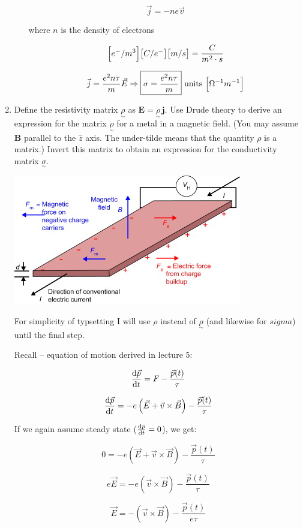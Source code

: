 \begin{enumerate}[label=(\alph*)]
\begin{itemize}
    \[ \vec{j} = - n e \vec{v} \]

    where $n$ is the density of electrons   

    \[ \brackets*{e^-/m^3}\brackets*{C/e^-} \brackets*{m/s} = \frac{C}{m^2 \cdot s} \]

    \[ \vec{j} = \frac{e^2 n \tau}{m} \vec{E} \Rightarrow \boxed{\sigma = \frac{e^2 n \tau}{m}} \text{ units } \brackets*{\Omega^{-1} m^{-1}}\]

\end{itemize}


\item Define the resistivity matrix $\underset{\sim}{\rho}$ as 
$\mathbf{E} = \underset{\sim}{\rho}\,\mathbf{j}$. 
Use Drude theory to derive an expression for the matrix 
$\underset{\sim}{\rho}$ for a metal in a magnetic field. 
(You may assume $\mathbf{B}$ parallel to the $\hat{z}$ axis. 
The under-tilde means that the quantity $\rho$ is a matrix.) 
Invert this matrix to obtain an expression for the conductivity matrix 
$\underset{\sim}{\sigma}$.

\divider

\begin{center}
    \includegraphics[width = 0.4 \linewidth]{Images/hall-effect.jpg}
\end{center}

For simplicity of typsetting I will use $\rho$ instead of $\underset{\sim}{\rho}$ (and likewise for $sigma$) until the final step.

Recall -- equation of motion derived in lecture 5:

\[ \dv{\vec{p}}{t} = F - \frac{\vec{p}(t)}{\tau} \]

\[ \dv{\vec{p}}{t} = -e \left( \vec{E} + \vec{v} \times \vec{B} \right) - \frac{\vec{p}(t)}{\tau} \]

If we again assume steady state ($\dv{p}{t} = 0$), we get:

\[ 0 = -e \left( \vec{E} + \vec{v} \times \vec{B} \right) - \frac{\vec{p}(t)}{\tau} \]

\[ e \vec{E} = - e \left( \vec{v} \times \vec{B} \right) - \frac{\vec{p}(t)}{\tau}\]

\[ \vec{E} = - \left( \vec{v} \times \vec{B} \right) - \frac{\vec{p}(t)}{e \tau}\]


\end{enumerate}
